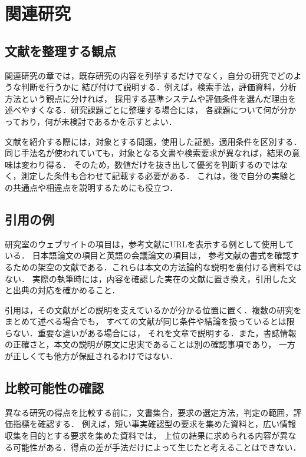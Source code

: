 \chapter{関連研究}
\label{sec:related_work}

\section{文献を整理する観点}
関連研究の章では，既存研究の内容を列挙するだけでなく，自分の研究でどのような判断を行うかに
結び付けて説明する．例えば，検索手法，評価資料，分析方法という観点に分ければ，
採用する基準システムや評価条件を選んだ理由を述べやすくなる．研究課題ごとに整理する場合には，
各課題について何が分かっており，何が未検討であるかを示すとよい．

文献を紹介する際には，対象とする問題，使用した証拠，適用条件を区別する．
同じ手法名が使われていても，対象となる文書や検索要求が異なれば，結果の意味は変わり得る．
そのため，数値だけを抜き出して優劣を判断するのではなく，測定した条件も合わせて記載する必要がある．
これは，後で自分の実験との共通点や相違点を説明するためにも役立つ．

\section{引用の例}
研究室のウェブサイトの項目\cite{RSL}は，参考文献にURLを表示する例として使用している．
日本語論文の項目\cite{exampleArticle}と英語の会議論文の項目\cite{exampleConference}は，
参考文献の書式を確認するための架空の文献である．これらは本文の方法論的な説明を裏付ける資料ではない．
実際の執筆時には，内容を確認した実在の文献に置き換え，引用した文と出典の対応を確かめること．

引用は，その文献がどの説明を支えているかが分かる位置に置く．複数の研究をまとめて述べる場合でも，
すべての文献が同じ条件や結論を扱っているとは限らない．重要な違いがある場合には，
それを文章で説明する．また，書誌情報の正確さと，本文の説明が原文に忠実であることは別の確認事項であり，
一方が正しくても他方が保証されるわけではない．

\newpage
\section{比較可能性の確認}
異なる研究の得点を比較する前に，文書集合，要求の選定方法，判定の範囲，評価指標を確認する．
例えば，短い事実確認型の要求を集めた資料と，広い情報収集を目的とする要求を集めた資料では，
上位の結果に求められる内容が異なる可能性がある．得点の差が手法だけによって生じたと考えることはできない．

